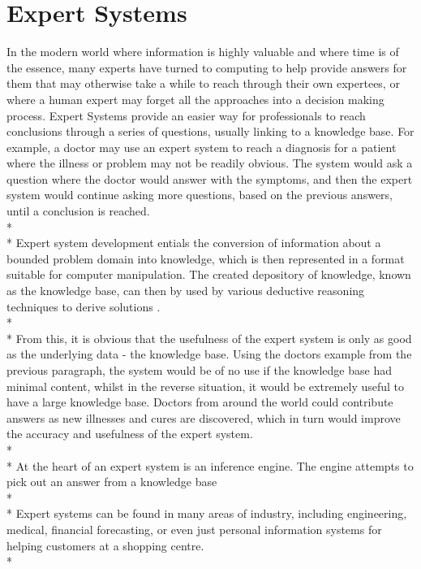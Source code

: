 \documentclass[12pt]{report}
\begin{document}
\section{Expert Systems}\label{sec:expert_systems}
In the modern world where information is highly valuable and where time is of the essence, many experts have turned to computing to help provide answers for them that may otherwise take a while to reach through their own expertees, or where a human expert may forget all the approaches into a decision making process.  Expert Systems provide an easier way for professionals to reach conclusions through a series of questions, usually linking to a knowledge base.  For example, a doctor may use an expert system to reach a diagnosis for a patient where the illness or problem may not be readily obvious.  The system would ask a question where the doctor would answer with the symptoms, and then the expert system would continue asking more questions, based on the previous answers, until a conclusion is reached.
\\*
\\*
Expert system development entials the conversion of information about a bounded problem domain into knowledge, which is then represented in a format suitable for computer manipulation.  The created depository of knowledge, known as the knowledge base, can then by used by various deductive reasoning techniques to derive solutions \citep{expertsystems98}.
\\*
\\*
From this, it is obvious that the usefulness of the expert system is only as good as the underlying data - the knowledge base.  Using the doctors example from the previous paragraph, the system would be of no use if the knowledge base had minimal content, whilst in the reverse situation, it would be extremely useful to have a large knowledge base.  Doctors from around the world could contribute answers as new illnesses and cures are discovered, which in turn would improve the accuracy and usefulness of the expert system.
\\*
\\*
At the heart of an expert system is an inference engine.  The engine attempts to pick out an answer from a knowledge base
\\*
\\*
Expert systems can be found in many areas of industry, including engineering, medical, financial forecasting, or even just personal information systems for helping customers at a shopping centre.
\\*
\end{document}
